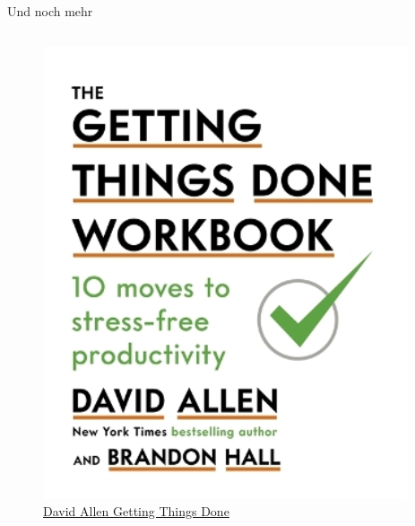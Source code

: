 \begin{frame}{Und noch mehr}
\begin{columns}[t]
\begin{column}{0.49\textwidth}
\begin{figure}
\begin{flushleft}
                \includegraphics[height=0.7\textheight]{graphics/GTD.png}
                \caption*{\href{https://www.thalia.de/shop/home/artikeldetails/A1052684525?ProvID=11000731&msclkid=add9b427aa0c13222c40d1b812e94a42&gclsrc=ds}{David Allen Getting Things Done}}    
            \end{flushleft}                
        \end{figure}        
    \end{column}
\end{columns}
\end{frame}